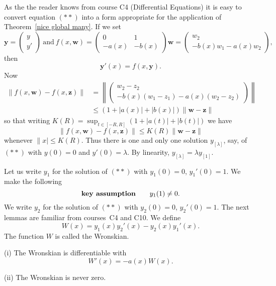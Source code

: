 As the the reader knows from course C4 (Differential Equations)
it is easy to convert equation $(**)$ into a form appropriate
for the application of Theorem~\ref{nice global many}.
If we set
\[{\mathbf y}=\begin{pmatrix}y\\y'\end{pmatrix}
\ \text{and}\ f(x,{\mathbf w})=
\begin{pmatrix}0&1\\-a(x)&-b(x)\end{pmatrix}{\mathbf w}
=\begin{pmatrix}w_{2}\\-b(x)w_{1}-a(x)w_{2}\end{pmatrix},\]
then
\[{\mathbf y}'(x)=f(x,{\mathbf y}).\]
Now
\begin{align*}
\|f(x,{\mathbf w})-f(x,{\mathbf z})\|
&=\left\|\begin{pmatrix}
w_{2}-z_{2}\\-b(x)(w_{1}-z_{1})-a(x)(w_{2}-z_{2})
\end{pmatrix}\right\|\\
&\leq (1+|a(x)|+|b(x)|)\|{\mathbf w}-{\mathbf z}\|
\end{align*}
so that writing $K(R)=\sup_{t\in[-R,R]}(1+|a(t)|+|b(t)|)$
we have
\[\|f(x,{\mathbf w})-f(x,{\mathbf z})\|\leq K(R)
\|{\mathbf w}-{\mathbf z}\|\]
whenever $\|x|\leq K(R)$.
Thus there is one and only one solution $y_{[\lambda]}$, say,
of $(**)$ with $y(0)=0$ and $y'(0)=\lambda$. By linearity,
$y_{[\lambda]}=\lambda y_{[1]}$.

Let us write $y_{1}$ for the solution of $(**)$ with
$y_{1}(0)=0$, $y_{1}'(0)=1$. We make the following
\[\text{\bf key assumption}\qquad y_{1}(1)\neq 0.\]
We write $y_{2}$ for the solution of $(**)$ with
$y_{2}(0)=0$, $y_{2}'(0)=1$. The next lemmas are
familiar from courses~C4 and C10. We define
\[W(x)=y_{1}(x)y_{2}'(x)-y_{2}(x)y_{1}'(x).\]
The function $W$ is called the Wronskian.
\begin{lemma} (i) The Wronskian is differentiable
with
\[W'(x)=-a(x)W(x).\]

(ii) The Wronskian is never zero.
\end{lemma}

